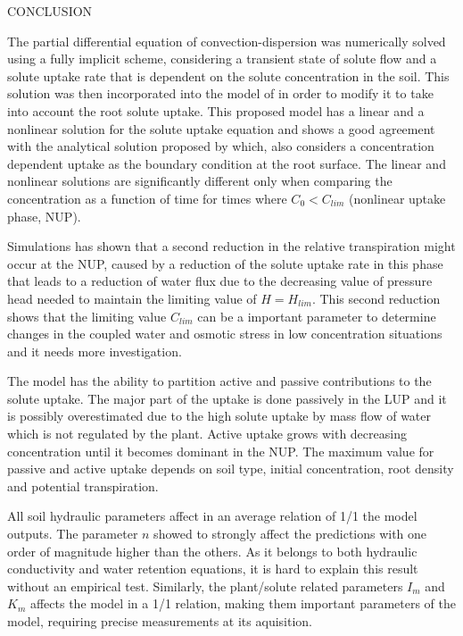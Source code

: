 \cleardoublepage
\chap CONCLUSION

The partial differential equation of convection-dispersion was numerically solved using a fully implicit scheme, considering a transient state of solute flow and a solute uptake rate that is dependent on the solute concentration in the soil.
This solution was then incorporated into the model of \citeonline[liersolute] in order to modify it to take into account the root solute uptake.
This proposed model has a linear and a nonlinear solution for the solute uptake equation and shows a good agreement with the analytical solution proposed by \citeonline[cushman] which, also considers a concentration dependent uptake as the boundary condition at the root surface.
The linear and nonlinear solutions are significantly different only when comparing the concentration as a function of time for times where $C_0 < C_{lim}$ (nonlinear uptake phase, NUP).

Simulations has shown that a second reduction in the relative transpiration might occur at the NUP, caused by a reduction of the solute uptake rate in this phase that leads to a reduction of water flux due to the decreasing value of pressure head needed to maintain the limiting value of $H=H_{lim}$.
This second reduction shows that the limiting value $C_{lim}$ can be a important parameter to determine changes in the coupled water and osmotic stress in low concentration situations and it needs more investigation.

The model has the ability to partition active and passive contributions to the solute uptake.
The major part of the uptake is done passively  in the LUP and it is possibly overestimated due to the high solute uptake by mass flow of water which is not regulated by the plant. 
Active uptake grows with decreasing concentration until it becomes dominant in the NUP.
The maximum value for passive and active uptake depends on soil type, initial concentration, root density and potential transpiration.

All soil hydraulic parameters affect in an average relation of 1/1 the model outputs.
The parameter $n$ showed to strongly affect the predictions with one order of magnitude higher than the others.
As it belongs to both hydraulic conductivity and water retention equations, it is hard to explain this result without an empirical test.
Similarly, the plant/solute related parameters $I_m$ and $K_m$ affects the model in a 1/1 relation, making them important parameters of the model, requiring precise measurements at its aquisition.

